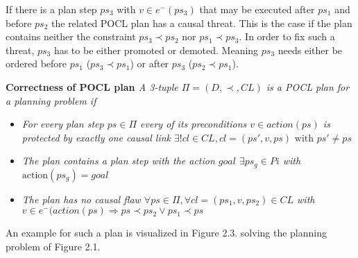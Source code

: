 If there is a plan step $ps_3$ with $v \in e^-(ps_3)$ that may be executed after $ps_1$ and before $ps_2$ the related POCL plan has a causal threat.
This is the case if the plan contains neither the constraint $ps_3 \prec ps_2$ nor $ps_1\prec ps_3$.
In order to fix such a threat, $ps_3$ has to be either promoted or demoted. Meaning $ps_3$ needs either be ordered before $ps_1$ ($ps_3 \prec ps_1$) or after $ps_3$ ($ps_2 \prec ps_1$).
\begin{Definition}
  \normalfont \textbf{Correctness of POCL plan \cite{McAllester}}
  \textit{
    A 3-tuple $\Pi=(D,\prec,CL)$ is a POCL plan for a planning problem if
  }
  \begin{itemize}
    \item  \textit{For every plan step $ps\in \Pi$ every of its preconditions $v\in action(ps)$ 
is protected by exactly one causal link $\exists! cl\in CL, cl=(ps',v,ps) \text{ with } ps' \neq ps$}
  \item  \textit{The plan contains a plan step with the action $goal$ $\exists ps_g \in Pi$ with $ \text{action}(ps_g)=goal$}
  \item  \textit{The plan has no causal flaw $\forall ps \in \Pi,\forall cl=(ps_1,v,ps_2) \in CL$ with $v \in e^-(action(ps) \Rightarrow ps \prec ps_2 \lor ps_1 \prec ps$}
  \end{itemize}
\end{Definition}
An example for such a plan is visualized in Figure 2.3. solving the planning problem of Figure 2.1.

